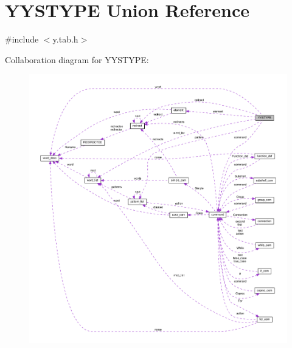 \hypertarget{unionYYSTYPE}{}\section{Y\+Y\+S\+T\+Y\+PE Union Reference}
\label{unionYYSTYPE}


{\ttfamily \#include $<$y.\+tab.\+h$>$}



Collaboration diagram for Y\+Y\+S\+T\+Y\+PE\+:
\nopagebreak
\begin{figure}[H]
\begin{center}
\leavevmode
\includegraphics[width=350pt]{unionYYSTYPE__coll__graph}
\end{center}
\end{figure}
